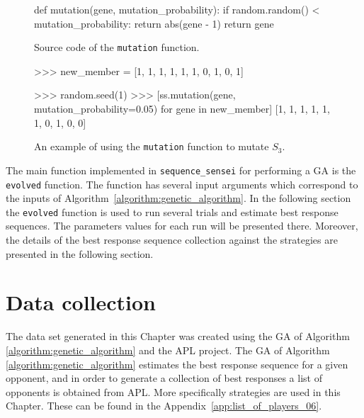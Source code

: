 \begin{figure}[!htbp]
    \begin{sourcepy}
def mutation(gene, mutation_probability):
    if random.random() < mutation_probability:
        return abs(gene - 1)
    return gene
\end{sourcepy}
\caption{Source code of the \texttt{mutation} function.}\label{fig:mutation_implementation}
\end{figure}

\begin{figure}[!htbp]
    \begin{usagepy}
>>> new_member = [1, 1, 1, 1, 1, 1, 0, 1, 0, 1]

>>> random.seed(1)
>>> [ss.mutation(gene, mutation_probability=0.05) for gene in new_member]
[1, 1, 1, 1, 1, 1, 0, 1, 0, 0]

\end{usagepy}
\caption{An example of using the \texttt{mutation} function to mutate
\(S_3\).}\label{fig:mutation_usage}
\end{figure}

The main function implemented in \texttt{sequence_sensei} for
performing a GA is the \texttt{evolved} function. The function has
several input arguments which correspond to the inputs of
Algorithm~\ref{algorithm:genetic_algorithm}. In the following section the
\texttt{evolved} function is used to run several trials and estimate
best response sequences. The parameters values for each run will be presented there.
Moreover, the details of the best response sequence collection against the
\numberofstrategiesbestsequences strategies are presented in the following section.

\section{Data collection}\label{section:generating_sequences}

The data set generated in this Chapter was created using the GA of Algorithm
\ref{algorithm:genetic_algorithm} and the APL project. The GA of Algorithm
\ref{algorithm:genetic_algorithm} estimates the best response sequence for a given
opponent, and in order to generate a collection of best responses a list of
opponents is obtained from APL. More specifically \numberofstrategiesbestsequences strategies are used
in this Chapter. These can be found in the Appendix~\ref{app:list_of_players_06}.

